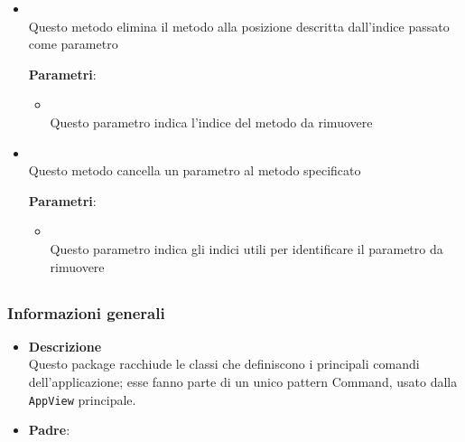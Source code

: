 \begin{itemize}
\begin{itemize}
\begin{itemize}
\end{itemize}
\item {}
\\ Questo metodo elimina il metodo alla posizione descritta dall'indice passato come parametro

\textbf{Parametri}:
\begin{itemize}
\item {}
\\ Questo parametro indica l'indice del metodo da rimuovere

\end{itemize}
\item {}
\\ Questo metodo cancella un parametro al metodo specificato

\textbf{Parametri}:
\begin{itemize}
\item {}
\\ Questo parametro indica gli indici utili per identificare il parametro da rimuovere

\end{itemize}
\end{itemize}
\end{itemize}
\subsection{}
\label{\nogloxy{swedesigner::client::model::utility}}
\subsubsection{Informazioni generali}
\begin{itemize}
\item \textbf{Descrizione}\\
Questo package racchiude le classi che definiscono i principali comandi dell'applicazione; esse fanno parte di un unico pattern Command, usato dalla \texttt{AppView} principale.
\item \textbf{Padre}: \hyperref[\nogloxy{swedesigner::client::model}]{}
\end{itemize}
